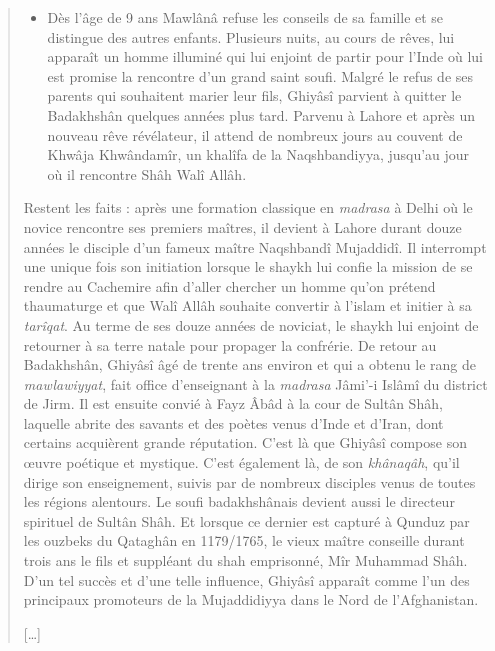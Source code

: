 \begin{quote}
\begin{itemize}
\item
 
  Dès l'âge de 9 ans Mawlânâ refuse les conseils de sa famille et se
  distingue des autres enfants. Plusieurs nuits, au cours de rêves, lui
  apparaît un homme illuminé qui lui enjoint de partir pour l'Inde où
  lui est promise la rencontre d'un grand saint soufi. Malgré le refus
  de ses parents qui souhaitent marier leur fils, Ghiyâsî parvient à
  quitter le Badakhshân quelques années plus tard. Parvenu à Lahore et
  après un nouveau rêve révélateur, il attend de nombreux jours au
  couvent de Khwâja Khwândamîr, un khalîfa de la Naqshbandiyya, jusqu'au
  jour où il rencontre Shâh Walî Allâh.
 
\end{itemize}

 
Restent les faits : après une formation classique en \emph{madrasa} à
Delhi où le novice rencontre ses premiers maîtres, il devient à Lahore
durant douze années le disciple d'un fameux maître Naqshbandî Mujaddidî.
Il interrompt une unique fois son initiation lorsque le shaykh lui
confie la mission de se rendre au Cachemire afin d'aller chercher un
homme qu'on prétend thaumaturge et que Walî Allâh souhaite convertir à
l'islam et initier à sa \emph{tarîqat}. Au terme de ses douze années de
noviciat, le shaykh lui enjoint de retourner à sa terre natale pour
propager la confrérie. De retour au Badakhshân, Ghiyâsî âgé de trente
ans environ et qui a obtenu le rang de \emph{mawlawiyyat}, fait office
d'enseignant à la \emph{madrasa} Jâmi'-i Islâmî du district de Jirm. Il
est ensuite convié à Fayz Âbâd à la cour de Sultân Shâh, laquelle abrite
des savants et des poètes venus d'Inde et d'Iran, dont certains
acquièrent grande réputation. C'est là que Ghiyâsî compose son œuvre
poétique et mystique. C'est également là, de son \emph{khânaqâh}, qu'il
dirige son enseignement, suivis par de nombreux disciples venus de
toutes les régions alentours. Le soufi badakhshânais devient aussi le
directeur spirituel de Sultân Shâh. Et lorsque ce dernier est capturé à
Qunduz par les ouzbeks du Qataghân en 1179/1765, le vieux maître
conseille durant trois ans le fils et suppléant du shah emprisonné, Mîr
Muhammad Shâh. D'un tel succès et d'une telle influence, Ghiyâsî
apparaît comme l'un des principaux promoteurs de la Mujaddidiyya dans le
Nord de l'Afghanistan.

{[}\ldots{]}
\end{quote}

